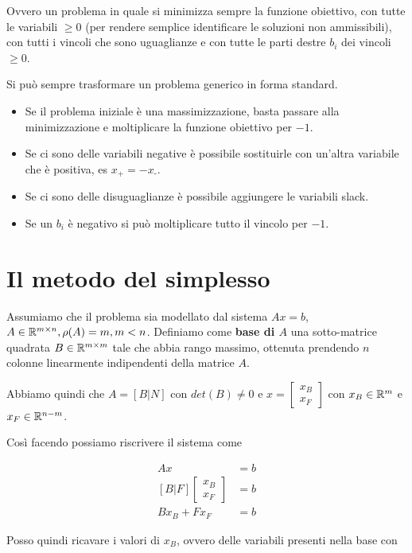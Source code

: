 \noindent Ovvero un problema in quale si minimizza sempre la funzione obiettivo, con tutte le variabili $\geq 0$ (per rendere semplice identificare le soluzioni non ammissibili), con tutti i vincoli che sono uguaglianze e con tutte le parti destre $b_i$ dei vincoli $\geq 0$.

Si può sempre trasformare un problema generico in forma standard.

\begin{itemize}
	\item Se il problema iniziale è una massimizzazione, basta passare alla minimizzazione e moltiplicare la funzione obiettivo per $-1$.
	\item Se ci sono delle variabili negative è possibile sostituirle con un'altra variabile che è positiva, es $x_+ = - x_\text{-}$.
	\item Se ci sono delle disuguaglianze è possibile aggiungere le variabili slack.
	\item Se un $b_i$ è negativo si può moltiplicare tutto il vincolo per $-1$. 
\end{itemize}

\section{Il metodo del simplesso}

\noindent Assumiamo che il problema sia modellato dal sistema $Ax = b$, $A \in \mathbb{R}^{m\times n}, \rho(A) = m, m <n$.
Definiamo come \textbf{base di $A$} una sotto-matrice quadrata $B \in \mathbb{R}^{m \times m }$ tale che abbia rango massimo, ottenuta prendendo $n$ colonne linearmente indipendenti della matrice $A$. 

Abbiamo quindi che $A = [B|N]$ con $det(B) \neq 0$ e $x = \begin{bmatrix}
x_B\\ 
x_F
\end{bmatrix}$ con $x_B \in \mathbb{R}^m$ e $x_F \in \mathbb{R}^{n-m}$.

Così facendo possiamo riscrivere il sistema come 

\begin{align}
Ax &= b \\
[B|F]\begin{bmatrix}
x_B\\ 
x_F
\end{bmatrix} &= b\\
B x_B + F x_F &= b
\end{align}

\noindent Posso quindi ricavare i valori di $x_B$, ovvero delle variabili presenti nella base con

